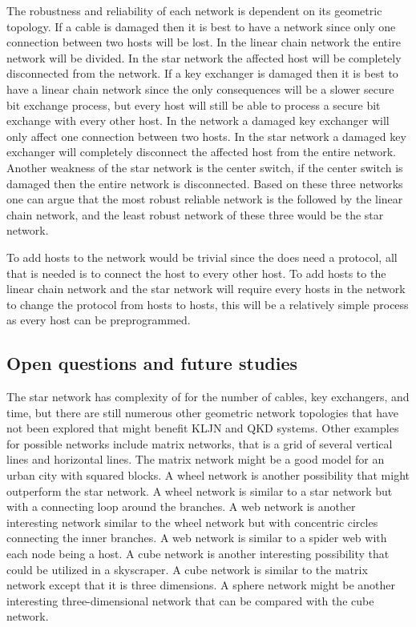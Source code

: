 \documentclass[a4paper,12pt,pdftex]{article}
\begin{document}
The robustness and reliability of each network is dependent on its geometric topology. If a cable is damaged then it is best to have a  network since only one connection between two hosts will be lost. In the linear chain network the entire network will be divided. In the star network the affected host will be completely disconnected from the network. If a key exchanger is damaged then it is best to have a linear chain network since the only consequences will be a slower secure bit exchange process, but every host will still be able to process a secure bit exchange with every other host. In the  network a damaged key exchanger will only affect one connection between two hosts. In the star network a damaged key exchanger will completely disconnect the affected host from the entire network. Another weakness of the star network is the center switch, if the center switch is damaged then the entire network is disconnected. Based on these three networks one can argue that the most robust reliable network is the  followed by the linear chain network, and the least robust network of these three would be the star network.

To add hosts to the  network would be trivial since the  does need a protocol, all that is needed is to connect the host to every other host. To add hosts to the linear chain network and the star network will require every hosts in the network to change the protocol from  hosts to  hosts, this will be a relatively simple process as every host can be preprogrammed.



\subsection{Open questions and future studies}

The star network has complexity of  for the number of cables, key exchangers, and time, but there are still numerous other geometric network topologies that have not been explored that might benefit KLJN and QKD systems. Other examples for possible networks include matrix networks, that is a grid of several vertical lines and horizontal lines. The matrix network might be a good model for an urban city with squared blocks. A wheel network is another possibility that might outperform the star network. A wheel network is similar to a star network but with a connecting loop around the branches. A web network is another interesting network similar to the wheel network but with concentric circles connecting the inner branches. A web network is similar to a spider web with each node being a host. A cube network is another interesting possibility that could be utilized in a skyscraper. A cube network is similar to the matrix network except that it is three dimensions. A sphere network might be another interesting three-dimensional network that can be compared with the cube network.
\end{document}
